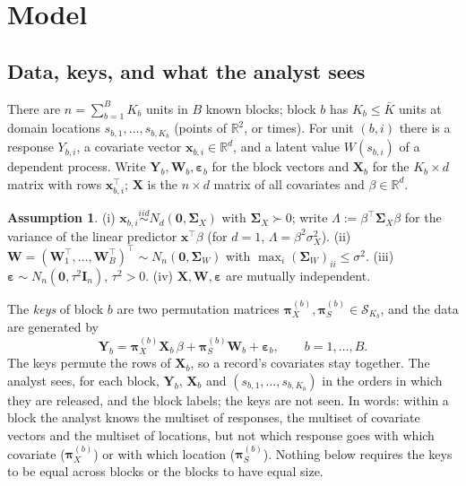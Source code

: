 \documentclass[11pt]{article}
\theoremstyle{definition}
\newtheorem{assumption}{Assumption}
\newcommand{\bX}{\mathbf{X}}
\newcommand{\bx}{\bm{x}}\newcommand{\bg}{\bm{g}}\newcommand{\bw}{\bm{w}}\newcommand{\bz}{\bm{z}}
\newcommand{\bY}{\mathbf{Y}}
\newcommand{\bW}{\mathbf{W}}
\newcommand{\bI}{\mathbf{I}}
\newcommand{\bzero}{\mathbf{0}}
\newcommand{\beps}{\boldsymbol{\varepsilon}}
\newcommand{\bSig}{\boldsymbol{\Sigma}}
\newcommand{\bpi}{\boldsymbol{\pi}}
\newcommand{\calS}{\mathcal{S}}
\begin{document}
\begin{abstract}
then almost free for the analyst) and raises the re-linking floors, and a smooth attribute is a second re-linking channel when the location is known; the dependent case is left open. Proofs are in the appendices.
\end{abstract}

\section{Model}\label{sec:model}

\subsection{Data, keys, and what the analyst sees}

There are $n=\sum_{b=1}^BK_b$ units in $B$ known blocks; block $b$ has $K_b\le\bar K$ units at domain locations $s_{b,1},\dots,s_{b,K_b}$ (points of $\mathbb R^2$, or times). For unit $(b,i)$ there is a response $Y_{b,i}$, a covariate vector $\bx_{b,i}\in\mathbb R^d$, and a latent value $W(s_{b,i})$ of a dependent process. Write $\bY_b,\bW_b,\beps_b$ for the block vectors and $\bX_b$ for the $K_b\times d$ matrix with rows $\bx_{b,i}^\top$; $\bX$ is the $n\times d$ matrix of all covariates and $\beta\in\mathbb R^d$.

\begin{assumption}\label{ass:dgp}
(i) $\bx_{b,i}\overset{iid}{\sim}N_d(\bzero,\bSig_X)$ with $\bSig_X\succ0$; write $\Lambda:=\beta^\top\bSig_X\beta$ for the variance of the linear predictor $\bx^\top\beta$ (for $d=1$, $\Lambda=\beta^2\sigma_X^2$). (ii) $\bW=(\bW_1^\top,\dots,\bW_B^\top)^\top\sim N_n(\bzero,\bSig_W)$ with $\max_i(\bSig_W)_{ii}\le\sigma^2$. (iii) $\beps\sim N_n(\bzero,\tau^2\bI_n)$, $\tau^2>0$. (iv) $\bX,\bW,\beps$ are mutually independent.
\end{assumption}

The \emph{keys} of block $b$ are two permutation matrices $\bpi_X^{(b)},\bpi_S^{(b)}\in\calS_{K_b}$, and the data are generated by
\begin{equation}\label{eq:model}
\bY_b=\bpi_X^{(b)}\bX_b\,\beta+\bpi_S^{(b)}\bW_b+\beps_b,\qquad b=1,\dots,B .
\end{equation}
The keys permute the rows of $\bX_b$, so a record's covariates stay together. The analyst sees, for each block, $\bY_b$, $\bX_b$ and $(s_{b,1},\dots,s_{b,K_b})$ in the orders in which they are released, and the block labels; the keys are not seen. In words: within a block the analyst knows the multiset of responses, the multiset of covariate vectors and the multiset of locations, but not which response goes with which covariate ($\bpi_X^{(b)}$) or with which location ($\bpi_S^{(b)}$). Nothing below requires the keys to be equal across blocks or the blocks to have equal size.
\end{document}
